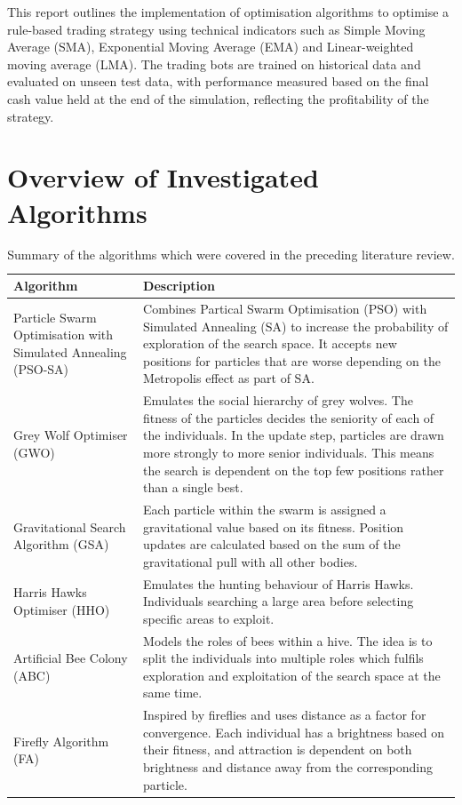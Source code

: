 \documentclass[a4paper, 12pt]{extarticle}
\begin{document}
This report outlines the implementation of optimisation algorithms to optimise a rule-based trading strategy using technical indicators such as Simple Moving Average (SMA), Exponential Moving Average (EMA) and Linear-weighted moving average (LMA). The trading bots are trained on historical data and evaluated on unseen test data, with performance measured based on the final cash value held at the end of the simulation, reflecting the profitability of the strategy. 

\section{Overview of Investigated Algorithms}

\begin{table}[ht]
    \centering
    \begin{tabularx}{\textwidth}{X X}
      \toprule
      \textbf{Algorithm} & \textbf{Description}\\
      \midrule
      Particle Swarm Optimisation with Simulated Annealing (PSO-SA) \cite{psosa} & Combines Partical Swarm Optimisation (PSO) \cite{pso} with Simulated Annealing (SA) to increase the probability of exploration of the search space. It accepts new positions for particles that are worse depending on the Metropolis effect as part of SA. \\
      Grey Wolf Optimiser (GWO) \cite{wolf} & Emulates the social hierarchy of grey wolves. The fitness of the particles decides the seniority of each of the individuals. In the update step, particles are drawn more strongly to more senior individuals. This means the search is dependent on the top few positions rather than a single best.\\
      Gravitational Search Algorithm (GSA) \cite{GSA} & Each particle within the swarm is assigned a gravitational value based on its fitness. Position updates are calculated based on the sum of the gravitational pull with all other bodies.\\
      Harris Hawks Optimiser (HHO) \cite{hawks} & Emulates the hunting behaviour of Harris Hawks. Individuals searching a large area before selecting specific areas to exploit.\\
      Artificial Bee Colony (ABC) \cite{abc} & Models the roles of bees within a hive. The idea is to split the individuals into multiple roles which fulfils exploration and exploitation of the search space at the same time.\\
      Firefly Algorithm (FA) \cite{firefly}& Inspired by fireflies and uses distance as a factor for convergence. Each individual has a brightness based on their fitness, and attraction is dependent on both brightness and distance away from the corresponding particle.\\ 
      \bottomrule
    \end{tabularx}
    \caption{Summary of the algorithms which were covered in the preceding literature review.}
    \label{tab:algorithms}
  \end{table}
\end{document}
